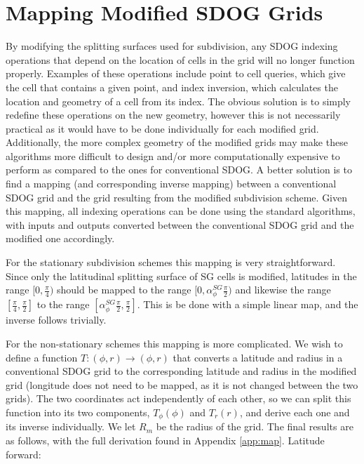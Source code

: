 \section{Mapping Modified SDOG Grids} \label{sec:mapping}
By modifying the splitting surfaces used for subdivision, any SDOG indexing operations that depend on the location of cells in the grid will no longer function properly. Examples of these operations include point to cell queries, which give the cell that contains a given point, and index inversion, which calculates the location and geometry of a cell from its index. The obvious solution is to simply redefine these operations on the new geometry, however this is not necessarily practical as it would have to be done individually for each modified grid. Additionally, the more complex geometry of the modified grids may make these algorithms more difficult to design and/or more computationally expensive to perform as compared to the ones for conventional SDOG. A better solution is to find a mapping (and corresponding inverse mapping) between a conventional SDOG grid and the grid resulting from the modified subdivision scheme. Given this mapping, all indexing operations can be done using the standard algorithms, with inputs and outputs converted between the conventional SDOG grid and the modified one accordingly. 

For the stationary subdivision schemes this mapping is very straightforward. Since only the latitudinal splitting surface of SG cells is modified, latitudes in the range $[0, \frac{\pi}{4})$ should be mapped to the range $[0, \alpha_{\phi}^{SG} \frac{\pi}{2})$ and likewise the range $[\frac{\pi}{4}, \frac{\pi}{2}]$ to the range $[\alpha_{\phi}^{SG} \frac{\pi}{2}, \frac{\pi}{2}]$. This is be done with a simple linear map, and the inverse follows trivially. 

For the non-stationary schemes this mapping is more complicated. We wish to define a function $T \colon (\phi, r) \rightarrow (\phi, r)$ that converts a latitude and radius in a conventional SDOG grid to the corresponding latitude and radius in the modified grid (longitude does not need to be mapped, as it is not changed between the two grids). The two coordinates act independently of each other, so we can split this function into its two components, $T_{\phi}(\phi)$ and $T_{r}(r)$, and derive each one and its inverse individually. We let $R_{m}$ be the radius of the grid. The final results are as follows, with the full derivation found in Appendix \ref{app:map}. Latitude forward:

